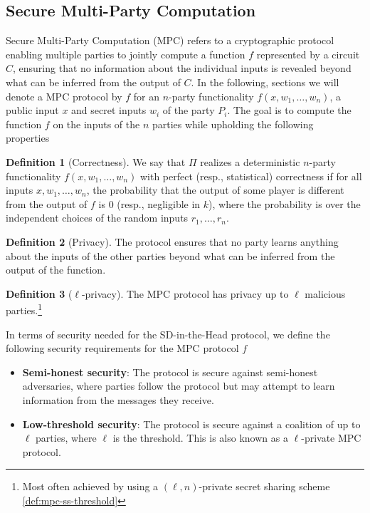 \documentclass[11pt]{report}
\theoremstyle{definition}
\newtheorem{definition}{Definition}[section]
\theoremstyle{plain}
\begin{document}
\subsection{Secure Multi-Party Computation}\label{sec:mpc}

Secure Multi-Party Computation (MPC) refers to a cryptographic protocol enabling multiple parties to jointly compute a function $f$ represented by a circuit $C$, ensuring that no information about the individual inputs is revealed beyond what can be inferred from the output of $C$. In the following, sections we will denote a MPC protocol by $f$ for an $n$-party functionality $f(x, w_1, \dots, w_n)$, a public input $x$ and secret inputs $w_i$ of the party $P_i$. The goal is to compute the function $f$ on the inputs of the $n$ parties while upholding the following properties~\cite{cramer2015secure}

\begin{definition}[Correctness]\label{def:mpc-correctness}
  We say that $\Pi$ realizes a deterministic $n$-party functionality $f(x, w_1, \dots, w_n)$ with perfect (resp., statistical) correctness if for all inputs $x, w_1, \dots, w_n$, the probability that the output of some player is different from the output of $f$ is $0$ (resp., negligible in $k$), where the probability is over the independent choices of the random inputs $r_1, \dots, r_n$.
\end{definition}

\begin{definition}[Privacy]\label{def:mpc-privacy}
  The protocol ensures that no party learns anything about the inputs of the other parties beyond what can be inferred from the output of the function.
\end{definition}

\begin{definition}[$\ell$-privacy]\label{def:mpc-ell-privacy}
  The MPC protocol has privacy up to $\ell$ malicious parties.\footnote{Most often achieved by using a $(\ell, n)$-private secret sharing scheme \autoref{def:mpc-ss-threshold}}
\end{definition}

In terms of security needed for the SD-in-the-Head protocol, we define the following security requirements for the MPC protocol $f$

\begin{itemize}
  \item \textbf{Semi-honest security}: The protocol is secure against semi-honest adversaries, where parties follow the protocol but may attempt to learn information from the messages they receive.
  \item \textbf{Low-threshold security}: The protocol is secure against a coalition of up to $\ell$ parties, where $\ell$ is the threshold. This is also known as a $\ell$-private MPC protocol.
\end{itemize}
\end{document}
